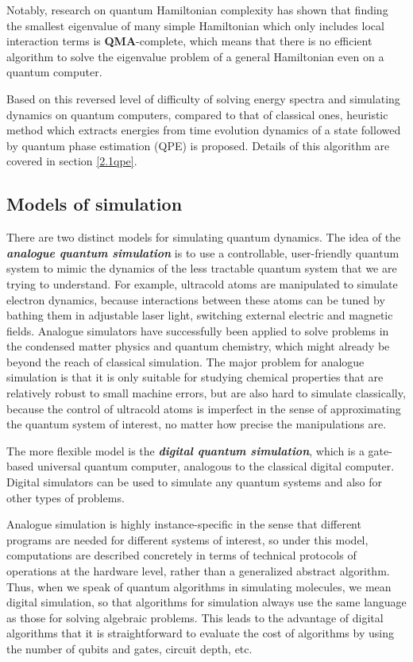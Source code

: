 \documentclass[journal=jctcce,manuscript=article]{achemso}
\begin{document}
Notably, research on quantum Hamiltonian complexity has shown that finding the smallest eigenvalue of many simple Hamiltonian which only includes local interaction terms is \textbf{QMA}-complete,\cite{barahona1982computational,Bookatz2014} which means that there is no efficient algorithm to solve the eigenvalue problem of a general Hamiltonian even on a quantum computer.\cite{kitaev2002classical}

Based on this reversed level of difficulty of solving energy spectra and simulating dynamics on quantum computers, compared to that of classical ones, heuristic method which extracts energies from time evolution dynamics of a state followed by quantum phase estimation (QPE)\cite{Abrams:1997ha,Abrams:1999ur} is proposed. Details of this algorithm are covered in section \ref{2.1qpe}.


\subsection{Models of simulation}
There are two distinct models for simulating quantum dynamics. The idea of the \textbf{\textit{analogue quantum simulation}} is to use a controllable, user-friendly quantum system to mimic the dynamics of the less tractable quantum system that we are trying to understand. For example, ultracold atoms are manipulated to simulate electron dynamics, because interactions between these atoms can be tuned by bathing them in adjustable laser light, switching external electric and magnetic fields. Analogue simulators have successfully been applied to solve problems in the condensed matter physics\cite{bernien2017probing, greiner2002quantum} and quantum chemistry,\cite{ArguelloLuengo:2019hx} which might already be beyond the reach of classical simulation. The major problem for analogue simulation is that it is only suitable for studying chemical properties that are relatively robust to small machine errors, but are also hard to simulate classically, because the control of ultracold atoms is imperfect in the sense of approximating the quantum system of interest, no matter how precise the manipulations are. 

The more flexible model is the \textbf{\textit{digital quantum simulation}}, which is a gate-based universal quantum computer, analogous to the classical digital computer. Digital simulators can be used to simulate any quantum systems\cite{Abrams:1997ha} and also for other types of problems.

Analogue simulation is highly instance-specific in the sense that different programs are needed for different systems of interest, so under this model, computations are described concretely in terms of technical protocols of operations at the hardware level, rather than a generalized abstract algorithm. Thus, when we speak of quantum algorithms in simulating molecules, we mean digital simulation, so that algorithms for simulation always use the same language as those for solving algebraic problems.\cite{childs2010quantum} This leads to the advantage of digital algorithms that it is straightforward to evaluate the cost of algorithms by using the number of qubits and gates, circuit depth, etc.
\end{document}
